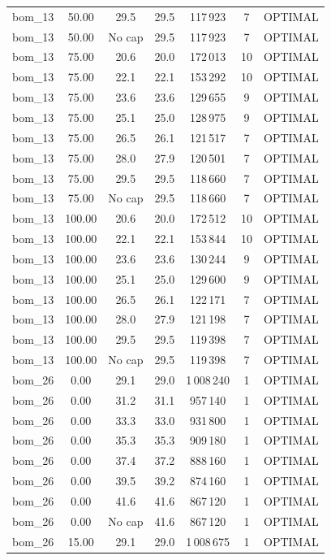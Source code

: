 \begin{table}[!htbp]
\begin{tabular}{lcccccc}
bom\_13 & 50.00 & 29.5 & 29.5 & 117\,923 & 7 & OPTIMAL \\
bom\_13 & 50.00 & No cap & 29.5 & 117\,923 & 7 & OPTIMAL \\
bom\_13 & 75.00 & 20.6 & 20.0 & 172\,013 & 10 & OPTIMAL \\
bom\_13 & 75.00 & 22.1 & 22.1 & 153\,292 & 10 & OPTIMAL \\
bom\_13 & 75.00 & 23.6 & 23.6 & 129\,655 & 9 & OPTIMAL \\
bom\_13 & 75.00 & 25.1 & 25.0 & 128\,975 & 9 & OPTIMAL \\
bom\_13 & 75.00 & 26.5 & 26.1 & 121\,517 & 7 & OPTIMAL \\
bom\_13 & 75.00 & 28.0 & 27.9 & 120\,501 & 7 & OPTIMAL \\
bom\_13 & 75.00 & 29.5 & 29.5 & 118\,660 & 7 & OPTIMAL \\
bom\_13 & 75.00 & No cap & 29.5 & 118\,660 & 7 & OPTIMAL \\
bom\_13 & 100.00 & 20.6 & 20.0 & 172\,512 & 10 & OPTIMAL \\
bom\_13 & 100.00 & 22.1 & 22.1 & 153\,844 & 10 & OPTIMAL \\
bom\_13 & 100.00 & 23.6 & 23.6 & 130\,244 & 9 & OPTIMAL \\
bom\_13 & 100.00 & 25.1 & 25.0 & 129\,600 & 9 & OPTIMAL \\
bom\_13 & 100.00 & 26.5 & 26.1 & 122\,171 & 7 & OPTIMAL \\
bom\_13 & 100.00 & 28.0 & 27.9 & 121\,198 & 7 & OPTIMAL \\
bom\_13 & 100.00 & 29.5 & 29.5 & 119\,398 & 7 & OPTIMAL \\
bom\_13 & 100.00 & No cap & 29.5 & 119\,398 & 7 & OPTIMAL \\
bom\_26 & 0.00 & 29.1 & 29.0 & 1\,008\,240 & 1 & OPTIMAL \\
bom\_26 & 0.00 & 31.2 & 31.1 & 957\,140 & 1 & OPTIMAL \\
bom\_26 & 0.00 & 33.3 & 33.0 & 931\,800 & 1 & OPTIMAL \\
bom\_26 & 0.00 & 35.3 & 35.3 & 909\,180 & 1 & OPTIMAL \\
bom\_26 & 0.00 & 37.4 & 37.2 & 888\,160 & 1 & OPTIMAL \\
bom\_26 & 0.00 & 39.5 & 39.2 & 874\,160 & 1 & OPTIMAL \\
bom\_26 & 0.00 & 41.6 & 41.6 & 867\,120 & 1 & OPTIMAL \\
bom\_26 & 0.00 & No cap & 41.6 & 867\,120 & 1 & OPTIMAL \\
bom\_26 & 15.00 & 29.1 & 29.0 & 1\,008\,675 & 1 & OPTIMAL \\

\end{tabular}
\end{table}
